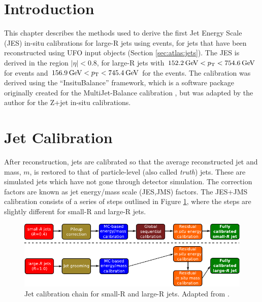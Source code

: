 \section{Introduction}
This chapter describes the methods used to derive the first Jet Energy Scale (JES) in-situ calibrations for large-R jets using \zjets events, for jets that have been reconstructed using UFO input objects (Section \ref{sec:atlas:jets}). The JES is derived in the region $|\eta|<0.8$, for large-R jets with $152.2\hspace{2pt}\text{Ge\kern -0.1em V} < p_{\text{T}} < 754.6\hspace{2pt}\text{Ge\kern -0.1em V}$ for \zee events and $156.9\hspace{2pt}\text{Ge\kern -0.1em V}<p_{\text{T}}<745.4\hspace{2pt}\text{Ge\kern -0.1em V}$ for the \zmm events. The calibration was derived using the ``InsituBalance'' framework, which is a software package originally created for the MultiJet-Balance calibration \cite{Atlas:largercali}, but was adapted by the author for the Z+jet in-situ calibrations.%

\section{Jet Calibration\label{sec:jetcal}}

After reconstruction, jets are calibrated so that the average reconstructed jet \pt and mass, $m$, is restored to that of particle-level (also called \textit{truth}) jets. These are simulated jets which have not gone through detector simulation. The correction factors are known as jet energy/mass scale (JES,JMS) factors. The JES+JMS calibration consists of a series of steps outlined in Figure \ref{fig:jetcali}, where the steps are slightly different for small-R and large-R jets.

\begin{figure}[t]
    \centering
    \includegraphics[width=\textwidth]{plots/atlas/calichain.pdf}
    \caption{Jet calibration chain for small-R and large-R jets. Adapted from \cite{Schramm:2017frb}.\label{fig:jetcali}}
\end{figure}

